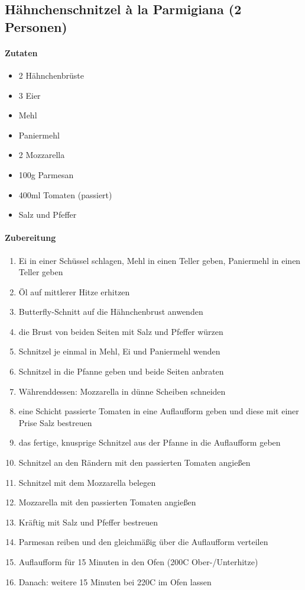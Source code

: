 \newpage
\subsection{Hähnchenschnitzel à la Parmigiana (2 Personen)}
\paragraph{Zutaten}
\begin{itemize}[noitemsep]
	\item 2 Hähnchenbrüste
	\item 3 Eier
	\item Mehl
	\item Paniermehl
	\item 2 Mozzarella
	\item 100g Parmesan
	\item 400ml Tomaten (passiert)
	\item Salz und Pfeffer
\end{itemize}
\paragraph{Zubereitung}
\begin{enumerate}[noitemsep]
	\item Ei in einer Schüssel schlagen, Mehl in einen Teller geben, Paniermehl in einen Teller geben
	\item Öl auf mittlerer Hitze erhitzen
	\item Butterfly-Schnitt auf die Hähnchenbrust anwenden
	\item die Brust von beiden Seiten mit Salz und Pfeffer würzen 
	\item Schnitzel je einmal in Mehl, Ei und Paniermehl wenden 
	\item Schnitzel in die Pfanne geben und beide Seiten anbraten
	\item Währenddessen: Mozzarella in dünne Scheiben schneiden
	\item eine Schicht passierte Tomaten in eine Auflaufform geben und diese mit einer Prise Salz bestreuen
	\item das fertige, knusprige Schnitzel aus der Pfanne in die Auflaufform geben 
	\item Schnitzel an den Rändern mit den passierten Tomaten angießen
	\item Schnitzel mit dem Mozzarella belegen
	\item Mozzarella mit den passierten Tomaten angießen
	\item Kräftig mit Salz und Pfeffer bestreuen 
	\item Parmesan reiben und den gleichmäßig über die Auflaufform verteilen
	\item Auflaufform für 15 Minuten in den Ofen (200\textdegree C Ober-/Unterhitze)
	\item Danach: weitere 15 Minuten bei 220\textdegree C im Ofen lassen 
\end{enumerate}
